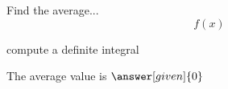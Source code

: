 \documentclass{ximera}
\begin{document}
\begin{center}
\begin{foldable}
\end{foldable}
\end{center}


\begin{problem} %
  Find the average...
  \[
  f(x)
  \]
    \begin{hint}
      compute a definite integral
    \end{hint}
    
		
		The average value is
		 $\answer[given]{0}$
\end{problem}


\begin{center}
\begin{foldable}
\end{foldable}
\end{center}
\end{document}
